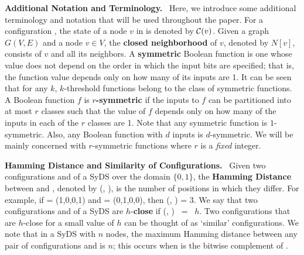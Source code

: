 \noindent
\textbf{Additional Notation and Terminology.}~ Here, we introduce some additional
terminology and notation that will be used 
throughout the paper. 
For a configuration \calc, the state of a node $v$ in \calc{}
is denoted by $\mbox{$\mathcal{C}$}(v)$.
Given a graph $G(V,E)$ and a node $v \in V$, the \textbf{closed neighborhood}
of $v$, denoted by $N[v]$, consists of $v$ and all its neighbors.
A \textbf{symmetric} Boolean function \cite{Crama-Hammer-2011}  is one whose
value does not depend on the order in
which the input bits are specified;
that is, the function value depends only on how many
of its inputs are 1.
It can be seen that for any $k$, $k$-threshold functions belong to the 
class of symmetric functions.
A Boolean function $f$ is \textbf{$r$-symmetric} \cite{BH+07}
if the inputs to $f$ can be partitioned into at most $r$ classes
such that the value of $f$ depends only on how many of the
inputs in each of the $r$ classes are 1.
Note that any symmetric function is $1$-symmetric.
Also, any Boolean function with $d$ inputs is $d$-symmetric.
We will be mainly concerned with $r$-symmetric functions 
where $r$ is a \emph{fixed} integer.

\smallskip

\noindent
\textbf{Hamming Distance and Similarity of Configurations.}~
Given two configurations \calcone{} and \calctwo{} of a SyDS
over the domain $\{0,1\}$,
the \textbf{Hamming Distance} between \calcone{} and \calctwo, 
denoted by \calh(\calcone, \calctwo), is
the number of positions in which they differ.
For example, if
\calcone{} = (1,0,0,1) and \calctwo{} = (0,1,0,0),   
then \calh(\calcone, \calctwo) = 3.  
We say that two configurations \calcone{} and \calctwo{} 
of a SyDS are $h$-\textbf{close} if \calh(\calco, \calct) ~=~ $h$. 
Two configurations that are $h$-close for a small value of $h$
can be thought of as `similar' configurations.  
We note that in a SyDS with $n$ nodes, 
the maximum Hamming distance between any pair of configurations
\calcone{} and \calctwo{} is $n$; this occurs when \calcone{}
is the bitwise complement of \calctwo. 

